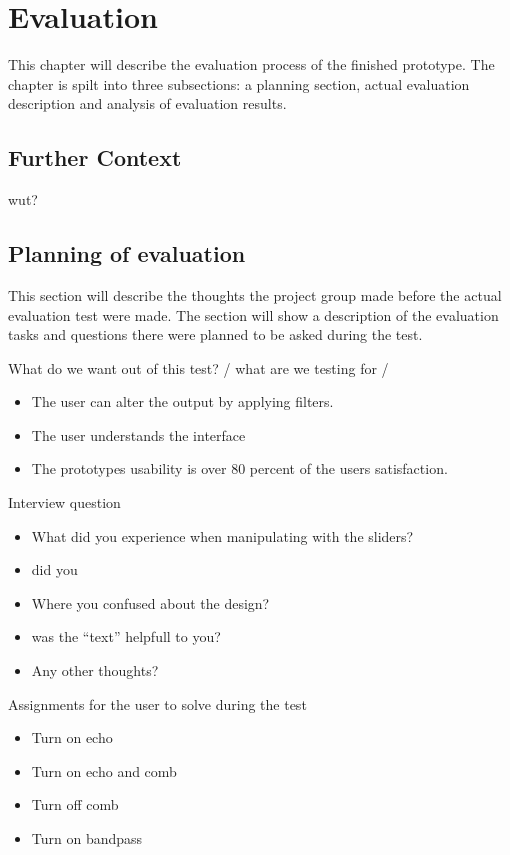 \chapter{Evaluation}\label{ch:evaluation}
This chapter will describe the evaluation process of the finished prototype. The chapter is spilt into three subsections: a planning section, actual evaluation description and analysis of evaluation results. 

\section{Further Context}\label{sec:furthercontext}
 wut?

\section{Planning of evaluation}
This section will describe the thoughts the project group made before the actual evaluation test were made. The section will show a description of the evaluation tasks and questions there were planned to be asked during the test. 

What do we want out of this test? / what are we testing for / 

\begin{itemize}
\item The user can alter the output by applying filters.
\item The user understands the interface  
\item The prototypes usability is over 80 percent of the users satisfaction.
\end{itemize}

Interview question 
\begin{itemize}
\item What did you experience when manipulating with the sliders?
\item did you 
\item Where you confused about the design?
\item was the “text” helpfull to you?
\item Any other thoughts?
\end{itemize}

Assignments for the user to solve during the test 
\begin{itemize}
\item Turn on echo
\item Turn on echo and comb
\item Turn off comb
\item Turn on bandpass 
\end{itemize}


